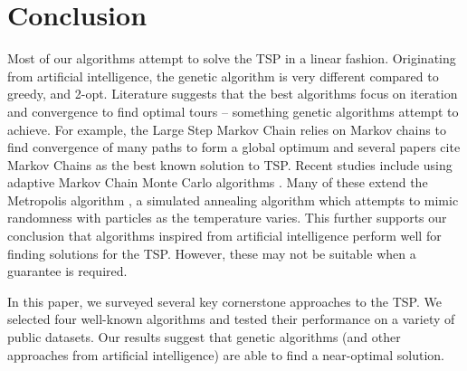 \documentclass[10pt,twocolumn,letterpaper]{article}
\begin{document}
\section{Conclusion}\label{sec:conc}
Most of our algorithms attempt to solve the TSP in a
linear fashion. Originating from artificial intelligence, the
genetic algorithm is very different compared to greedy, and 2-opt. Literature suggests that the
best algorithms focus on iteration and convergence to find
optimal tours -- something genetic algorithms attempt to
achieve. For example, the Large Step Markov Chain \cite{hong1997improved}
relies on Markov chains to find convergence of many paths
to form a global optimum and several papers cite Markov
Chains as the best known solution to TSP. Recent studies include using adaptive Markov Chain Monte Carlo algorithms \cite{qiu2008adaptive}. Many of these extend the Metropolis algorithm \cite{homaifar1992schema}, 
a simulated annealing algorithm which attempts to mimic randomness with particles as the temperature varies. This further supports our conclusion that algorithms inspired from
artificial intelligence perform well for finding solutions for the TSP. 
However, these may not be suitable when a guarantee is required.

In this paper, we surveyed several key cornerstone approaches to the TSP. We selected
four well-known algorithms and tested their performance on
a variety of public datasets. Our results suggest that genetic algorithms (and other approaches from artificial intelligence) are able to find a near-optimal solution.

{\small


}
\end{document}
